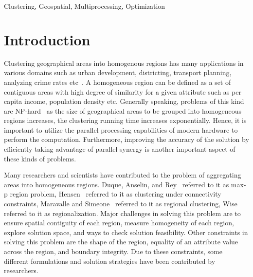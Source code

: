 \documentclass[conference]{IEEEtran}
\begin{document}
\begin{IEEEkeywords}
Clustering, Geospatial, Multiprocessing, Optimization
\end{IEEEkeywords}

\section{Introduction}
Clustering geographical areas into homogenous regions has many applications in
various domains such as urban development, districting, transport planning,
analyzing crime rates etc~\cite{r26}. A homogeneous region can be defined as a set
of contiguous areas with high degree of similarity for a given attribute such as
per capita income, population density etc. Generally speaking, problems of this kind are
 NP-hard~\cite{r1} as the size of geographical areas to be
grouped into homogeneous regions increases, the clustering running time
increases exponentially. Hence, it is important to utilize the parallel
processing capabilities of modern hardware to perform the computation. Furthermore, improving the accuracy of the solution by efficiently taking advantage of parallel synergy is another important aspect of these kinds of problems.

Many researchers and scientists have contributed to the problem of aggregating
areas into homogeneous regions. Duque, Anselin, and Rey~\cite{r1} referred to it
as max-p region problem, Hensen~\cite{r2} referred to it as clustering under
connectivity constraints, Maravalle and Simeone~\cite{r3} referred to it as
regional clustering, Wise~\cite{r25} referred to it as regionalization. Major
challenges in solving this problem are to ensure spatial contiguity of each
region, measure homogeneity of each region, explore solution space, and ways to
check solution feasibility. Other constraints in solving this problem are the shape
of the region, equality of an attribute value across the region, and boundary
integrity. Due to these constraints, some different formulations and
solution strategies have been contributed by researchers.
\end{document}
